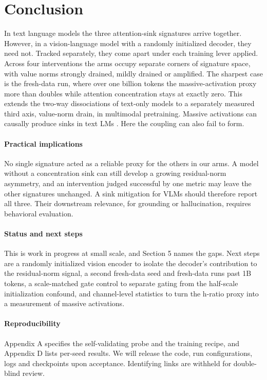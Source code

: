 \documentclass{article}
\begin{document}
\section{Conclusion}

In text language models the three attention-sink signatures arrive together. However, in a vision-language model with a randomly initialized decoder, they need not. Tracked separately, they come apart under each training lever applied. Across four interventions the arms occupy separate corners of signature space, with value norms strongly drained, mildly drained or amplified. The sharpest case is the fresh-data run, where over one billion tokens the massive-activation proxy more than doubles while attention concentration stays at exactly zero. This extends the two-way dissociations of text-only models \cite{ref9,ref10} to a separately measured third axis, value-norm drain, in multimodal pretraining. Massive activations can causally produce sinks in text LMs \cite{ref7}. Here the coupling can also fail to form.

\paragraph{Practical implications} No single signature acted as a reliable proxy for the others in our arms. A model without a concentration sink can still develop a growing residual-norm asymmetry, and an intervention judged successful by one metric may leave the other signatures unchanged. A sink mitigation for VLMs should therefore report all three. Their downstream relevance, for grounding or hallucination, requires behavioral evaluation.

\paragraph{Status and next steps} This is work in progress at small scale, and Section 5 names the gaps. Next steps are a randomly initialized vision encoder to isolate the decoder's contribution to the residual-norm signal, a second fresh-data seed and fresh-data runs past 1B tokens, a scale-matched gate control to separate gating from the half-scale initialization confound, and channel-level statistics to turn the h-ratio proxy into a measurement of massive activations.

\paragraph{Reproducibility} Appendix A specifies the self-validating probe and the training recipe, and Appendix D lists per-seed results. We will release the code, run configurations, logs and checkpoints upon acceptance. Identifying links are withheld for double-blind review.
\end{document}
